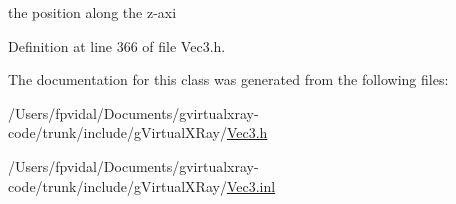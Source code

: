 the position along the z-\/axi 



Definition at line 366 of file Vec3.h.



The documentation for this class was generated from the following files:\begin{DoxyCompactItemize}
\item 
/Users/fpvidal/Documents/gvirtualxray-\/code/trunk/include/gVirtualXRay/\hyperlink{_vec3_8h}{Vec3.h}\item 
/Users/fpvidal/Documents/gvirtualxray-\/code/trunk/include/gVirtualXRay/\hyperlink{_vec3_8inl}{Vec3.inl}\end{DoxyCompactItemize}
